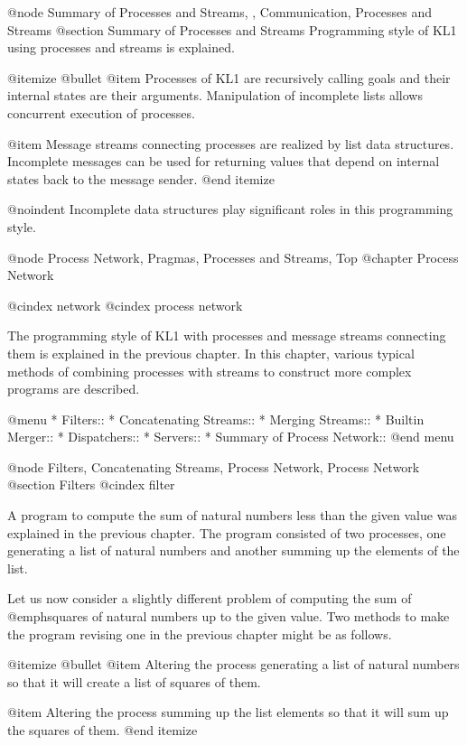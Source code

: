 {@node Summary of Processes and Streams,  , Communication, Processes and Streams
@section Summary of Processes and Streams
Programming style of KL1 using processes and streams is explained.

@itemize @bullet
@item
Processes of KL1 are recursively calling goals and their internal states
are their arguments.  Manipulation of incomplete lists allows concurrent
execution of processes.

@item
Message streams connecting processes are realized by list data
structures.  Incomplete messages can be used for returning values that
depend on internal states back to the message sender.
@end itemize

@noindent
Incomplete data structures play significant roles in this programming
style.

@node Process Network, Pragmas, Processes and Streams, Top
@chapter Process Network

@cindex network
@cindex process network

The programming style of KL1 with processes and message streams
connecting them is explained in the previous chapter.  In this chapter,
various typical methods of combining processes with streams to construct
more complex programs are described.

@menu
* Filters::                     
* Concatenating Streams::       
* Merging Streams::             
* Builtin Merger::              
* Dispatchers::                 
* Servers::                     
* Summary of Process Network::  
@end menu

@node Filters, Concatenating Streams, Process Network, Process Network
@section Filters
@cindex filter

A program to compute the sum of natural numbers less than the given
value was explained in the previous chapter.  The program consisted of
two processes, one generating a list of natural numbers and another
summing up the elements of the list.

Let us now consider a slightly different problem of computing the sum
of @emph{squares} of natural numbers up to the given value.  Two
methods to make the program revising one in the previous chapter might
be as follows.

@itemize @bullet
@item
Altering the process generating a list of natural numbers so that it
will create a list of squares of them.

@item
Altering the process summing up the list elements so that it will sum
up the squares of them.
@end itemize

}
